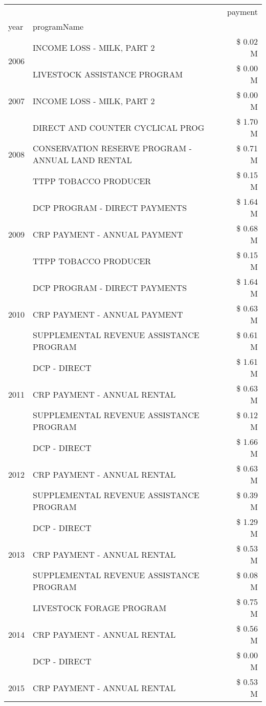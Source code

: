 \begin{tabular}{llr}
\toprule
 &  & payment \\
year & programName &  \\
\midrule
\multirow[t]{2}{*}{2006} & INCOME LOSS - MILK, PART 2 & \$ 0.02 M \\
 & LIVESTOCK ASSISTANCE PROGRAM & \$ 0.00 M \\
\cline{1-3}
2007 & INCOME LOSS - MILK, PART 2 & \$ 0.00 M \\
\cline{1-3}
\multirow[t]{3}{*}{2008} & DIRECT AND COUNTER CYCLICAL PROG & \$ 1.70 M \\
 & CONSERVATION RESERVE PROGRAM - ANNUAL LAND RENTAL & \$ 0.71 M \\
 & TTPP TOBACCO PRODUCER & \$ 0.15 M \\
\cline{1-3}
\multirow[t]{3}{*}{2009} & DCP PROGRAM - DIRECT PAYMENTS & \$ 1.64 M \\
 & CRP PAYMENT - ANNUAL PAYMENT & \$ 0.68 M \\
 & TTPP TOBACCO PRODUCER & \$ 0.15 M \\
\cline{1-3}
\multirow[t]{3}{*}{2010} & DCP PROGRAM - DIRECT PAYMENTS & \$ 1.64 M \\
 & CRP PAYMENT - ANNUAL PAYMENT & \$ 0.63 M \\
 & SUPPLEMENTAL REVENUE ASSISTANCE PROGRAM & \$ 0.61 M \\
\cline{1-3}
\multirow[t]{3}{*}{2011} & DCP - DIRECT & \$ 1.61 M \\
 & CRP PAYMENT - ANNUAL RENTAL & \$ 0.63 M \\
 & SUPPLEMENTAL REVENUE ASSISTANCE PROGRAM & \$ 0.12 M \\
\cline{1-3}
\multirow[t]{3}{*}{2012} & DCP - DIRECT & \$ 1.66 M \\
 & CRP PAYMENT - ANNUAL RENTAL & \$ 0.63 M \\
 & SUPPLEMENTAL REVENUE ASSISTANCE PROGRAM & \$ 0.39 M \\
\cline{1-3}
\multirow[t]{3}{*}{2013} & DCP - DIRECT & \$ 1.29 M \\
 & CRP PAYMENT - ANNUAL RENTAL & \$ 0.53 M \\
 & SUPPLEMENTAL REVENUE ASSISTANCE PROGRAM & \$ 0.08 M \\
\cline{1-3}
\multirow[t]{3}{*}{2014} & LIVESTOCK FORAGE PROGRAM & \$ 0.75 M \\
 & CRP PAYMENT - ANNUAL RENTAL & \$ 0.56 M \\
 & DCP - DIRECT & \$ 0.00 M \\
\cline{1-3}
\multirow[t]{3}{*}{2015} & CRP PAYMENT - ANNUAL RENTAL & \$ 0.53 M \\

\end{tabular}
